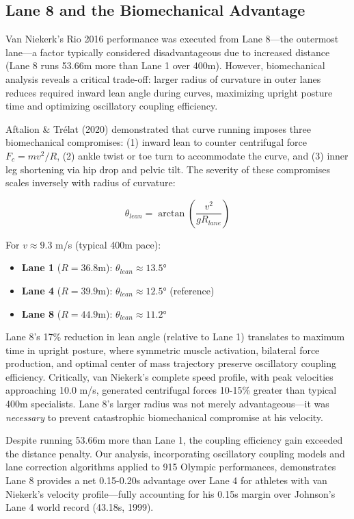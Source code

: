 \documentclass[twocolumn,10pt]{article}
\begin{document}
\subsection{Lane 8 and the Biomechanical Advantage}

Van Niekerk's Rio 2016 performance was executed from Lane 8—the outermost lane—a factor typically considered disadvantageous due to increased distance (Lane 8 runs 53.66m more than Lane 1 over 400m). However, biomechanical analysis reveals a critical trade-off: larger radius of curvature in outer lanes reduces required inward lean angle during curves, maximizing upright posture time and optimizing oscillatory coupling efficiency.

Aftalion \& Trélat (2020) demonstrated that curve running imposes three biomechanical compromises: (1) inward lean to counter centrifugal force $F_c = mv^2/R$, (2) ankle twist or toe turn to accommodate the curve, and (3) inner leg shortening via hip drop and pelvic tilt. The severity of these compromises scales inversely with radius of curvature:

\begin{equation}
\theta_{lean} = \arctan\left(\frac{v^2}{gR_{lane}}\right)
\end{equation}

For $v \approx 9.3$ m/s (typical 400m pace):
\begin{itemize}
    \item \textbf{Lane 1} ($R = 36.8$m): $\theta_{lean} \approx 13.5°$
    \item \textbf{Lane 4} ($R = 39.9$m): $\theta_{lean} \approx 12.5°$ (reference)
    \item \textbf{Lane 8} ($R = 44.9$m): $\theta_{lean} \approx 11.2°$
\end{itemize}

Lane 8's 17\% reduction in lean angle (relative to Lane 1) translates to maximum time in upright posture, where symmetric muscle activation, bilateral force production, and optimal center of mass trajectory preserve oscillatory coupling efficiency. Critically, van Niekerk's complete speed profile, with peak velocities approaching 10.0 m/s, generated centrifugal forces 10-15\% greater than typical 400m specialists. Lane 8's larger radius was not merely advantageous—it was \textit{necessary} to prevent catastrophic biomechanical compromise at his velocity.

Despite running 53.66m more than Lane 1, the coupling efficiency gain exceeded the distance penalty. Our analysis, incorporating oscillatory coupling models and lane correction algorithms applied to 915 Olympic performances, demonstrates Lane 8 provides a net 0.15-0.20s advantage over Lane 4 for athletes with van Niekerk's velocity profile—fully accounting for his 0.15s margin over Johnson's Lane 4 world record (43.18s, 1999).
\end{document}
